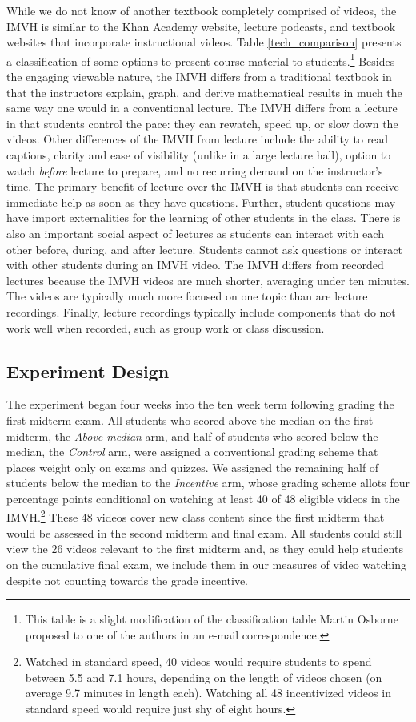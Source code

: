 \documentclass[12pt]{article}
\begin{document}
While we do not know of another textbook completely comprised of videos, the IMVH is similar to the Khan Academy website, lecture podcasts, and textbook websites that incorporate instructional videos. Table \ref{tech_comparison} presents a classification of some options to present course material to students.\footnote{This table is a slight modification of the classification table Martin Osborne proposed to one of the authors in an e-mail correspondence.} Besides the engaging viewable nature, the IMVH differs from a traditional textbook in that the instructors explain, graph, and derive mathematical results in much the same way one would in a conventional lecture. The IMVH differs from a lecture in that students control the pace: they can rewatch, speed up, or slow down the videos. Other differences of the IMVH from lecture include the ability to read captions, clarity and ease of visibility (unlike in a large lecture hall), option to watch \textit{before} lecture to prepare, and no recurring demand on the instructor's time. The primary benefit of lecture over the IMVH is that students can receive immediate help as soon as they have questions. Further, student questions may have import externalities for the learning of other students in the class. There is also an important social aspect of lectures as students can interact with each other before, during, and after lecture. Students cannot ask questions or interact with other students during an IMVH video. The IMVH differs from recorded lectures because the IMVH videos are much shorter, averaging under ten minutes. The videos are typically much more focused on one topic than are lecture recordings. Finally, lecture recordings typically include components that do not work well when recorded, such as group work or class discussion.

\subsection{Experiment Design} \label{expdesign}

The experiment began four weeks into the ten week term following grading the first midterm exam. All students who scored above the median on the first midterm, the \textit{Above median} arm, and half of students who scored below the median, the \textit{Control} arm, were assigned a conventional grading scheme that places weight only on exams and quizzes. We assigned the remaining half of students below the median to the \textit{Incentive} arm, whose grading scheme allots four percentage points conditional on watching at least 40 of 48 eligible videos in the IMVH.\footnote{Watched in standard speed, 40 videos would require students to spend between 5.5 and 7.1 hours, depending on the length of videos chosen (on average 9.7 minutes in length each). Watching all 48 incentivized videos in standard speed would require just shy of eight hours.} These 48 videos cover new class content since the first midterm that would be assessed in the second midterm and final exam. All students could still view the 26 videos relevant to the first midterm and, as they could help students on the cumulative final exam, we include them in our measures of video watching despite not counting towards the grade incentive.
\end{document}
